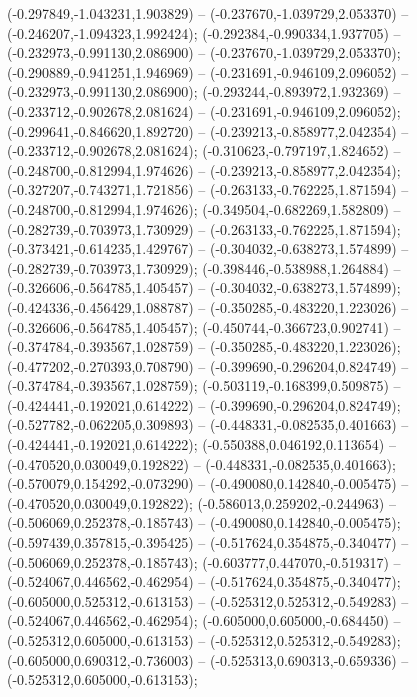  (-0.297849,-1.043231,1.903829) -- (-0.237670,-1.039729,2.053370) -- (-0.246207,-1.094323,1.992424);
 (-0.292384,-0.990334,1.937705) -- (-0.232973,-0.991130,2.086900) -- (-0.237670,-1.039729,2.053370);
 (-0.290889,-0.941251,1.946969) -- (-0.231691,-0.946109,2.096052) -- (-0.232973,-0.991130,2.086900);
 (-0.293244,-0.893972,1.932369) -- (-0.233712,-0.902678,2.081624) -- (-0.231691,-0.946109,2.096052);
 (-0.299641,-0.846620,1.892720) -- (-0.239213,-0.858977,2.042354) -- (-0.233712,-0.902678,2.081624);
 (-0.310623,-0.797197,1.824652) -- (-0.248700,-0.812994,1.974626) -- (-0.239213,-0.858977,2.042354);
 (-0.327207,-0.743271,1.721856) -- (-0.263133,-0.762225,1.871594) -- (-0.248700,-0.812994,1.974626);
 (-0.349504,-0.682269,1.582809) -- (-0.282739,-0.703973,1.730929) -- (-0.263133,-0.762225,1.871594);
 (-0.373421,-0.614235,1.429767) -- (-0.304032,-0.638273,1.574899) -- (-0.282739,-0.703973,1.730929);
 (-0.398446,-0.538988,1.264884) -- (-0.326606,-0.564785,1.405457) -- (-0.304032,-0.638273,1.574899);
 (-0.424336,-0.456429,1.088787) -- (-0.350285,-0.483220,1.223026) -- (-0.326606,-0.564785,1.405457);
 (-0.450744,-0.366723,0.902741) -- (-0.374784,-0.393567,1.028759) -- (-0.350285,-0.483220,1.223026);
 (-0.477202,-0.270393,0.708790) -- (-0.399690,-0.296204,0.824749) -- (-0.374784,-0.393567,1.028759);
 (-0.503119,-0.168399,0.509875) -- (-0.424441,-0.192021,0.614222) -- (-0.399690,-0.296204,0.824749);
 (-0.527782,-0.062205,0.309893) -- (-0.448331,-0.082535,0.401663) -- (-0.424441,-0.192021,0.614222);
 (-0.550388,0.046192,0.113654) -- (-0.470520,0.030049,0.192822) -- (-0.448331,-0.082535,0.401663);
 (-0.570079,0.154292,-0.073290) -- (-0.490080,0.142840,-0.005475) -- (-0.470520,0.030049,0.192822);
 (-0.586013,0.259202,-0.244963) -- (-0.506069,0.252378,-0.185743) -- (-0.490080,0.142840,-0.005475);
 (-0.597439,0.357815,-0.395425) -- (-0.517624,0.354875,-0.340477) -- (-0.506069,0.252378,-0.185743);
 (-0.603777,0.447070,-0.519317) -- (-0.524067,0.446562,-0.462954) -- (-0.517624,0.354875,-0.340477);
 (-0.605000,0.525312,-0.613153) -- (-0.525312,0.525312,-0.549283) -- (-0.524067,0.446562,-0.462954);
 (-0.605000,0.605000,-0.684450) -- (-0.525312,0.605000,-0.613153) -- (-0.525312,0.525312,-0.549283);
 (-0.605000,0.690312,-0.736003) -- (-0.525313,0.690313,-0.659336) -- (-0.525312,0.605000,-0.613153);
